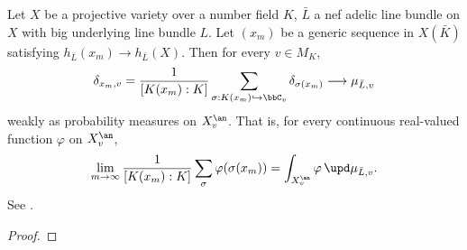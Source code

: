 \begin{theorem}[label=\labelNFM{thm:equidistribution-of-small-points}, status=draft, tag=0000000]
	Let $X$ be a projective variety over a number field $K$, $\bar{L}$ a nef adelic line bundle on $X$ with big underlying line bundle $L$.
	Let $(x_m)$ be a generic sequence in $X(\bar K)$ satisfying $h_{\bar L}(x_m) \to h_{\bar L}(X)$.
	Then for every $v \in M_K$,
	\[ \delta_{x_m,v} = \frac{1}{[K(x_m):K]}\sum_{\sigma:K(x_m)\hookrightarrow\bbC_v}\delta_{\sigma(x_m)} \longrightarrow \mu_{\bar L,v} \]
	weakly as probability measures on $X_v^\an$.
	That is, for every continuous real-valued function $\varphi$ on $X_v^\an$,
	\[ \lim_{m \to \infty}\frac{1}{[K(x_m):K]}\sum_{\sigma}\varphi(\sigma(x_m)) = \int_{X_v^\an}\varphi\,\upd\mu_{\bar L,v}. \]
	See \cite[Theorem~5.4.3]{Yuan-Zhang-2026-AdelicLineBundles}.
\end{theorem}
\begin{proof}
	\Yang{}
\end{proof}

